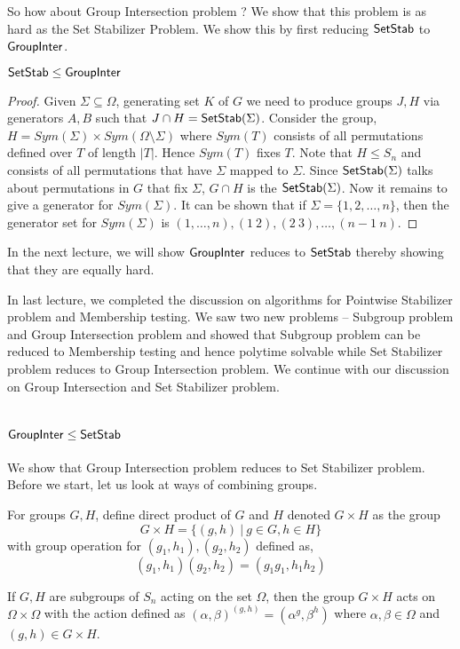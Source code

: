 So how about Group Intersection problem ? We show that this problem is as hard
as the Set Stabilizer Problem. We show this by first reducing ${\sf SetStab}$ to
${\sf GroupInter}$.
\begin{claim}
${\sf SetStab} \le {\sf GroupInter}$
\end{claim}
\begin{proof}
	Given $\Sigma \subseteq \Omega$, generating set $K$ of $G$ we need to
	produce groups $J,H$ via generators $A,B$ such that $J \cap H =
	{\sf SetStab}(\Sigma)$. Consider the group, $H = Sym(\Sigma) \times
	Sym(\Omega \setminus \Sigma)$ where $Sym(T)$  
	consists of all permutations defined over $T$ of length $|T|$. Hence
	$Sym(T)$ fixes $T$. Note that $H \le S_n$ and consists of all
	permutations that have $\Sigma$ mapped to $\Sigma$. Since
	${\sf SetStab}(\Sigma)$ talks about permutations in $G$ that fix $\Sigma$,
	$G \cap H$ is the ${\sf SetStab}(\Sigma)$. Now it remains to give a
	generator for $Sym(\Sigma)$. It can be shown that if $\Sigma
	=\{1,2,\ldots,n\}$, then the generator set for $Sym(\Sigma)$ is
	$(1,\ldots, n), (1~2),(2~3),
	\ldots, (n-1~ n)$.
\end{proof}
In the next lecture, we will show ${\sf GroupInter}$ reduces to ${\sf SetStab}$ thereby
showing that they are equally hard.


In last lecture, we completed the discussion on algorithms for Pointwise
Stabilizer problem and Membership testing. We saw two new problems -- Subgroup
problem and Group Intersection problem and showed that Subgroup problem can be
reduced to Membership testing and hence polytime solvable while Set Stabilizer
problem reduces to Group Intersection problem. We continue with our discussion
on Group Intersection and Set Stabilizer problem.

\section{${\sf GroupInter} \le {\sf SetStab}$}
We show that Group Intersection problem reduces to Set Stabilizer problem. 
Before we start, let us look at ways of combining groups.
\begin{definition}
For groups $G,H$, define direct product of $G$ and $H$ denoted $G \times H$ as
the group 
\[ G \times H = \{(g,h) ~|~ g \in G,h \in H\} \]
with group operation for $(g_1, h_1), (g_2,h_2)$ defined as,
\[ (g_1,h_1)(g_2,h_2) = (g_1g_1,h_1h_2) \]

If $G,H$ are subgroups of $S_n$ acting on the set $\Omega$, then the group $G
\times H$ acts on $\Omega \times \Omega$ with the action defined as
$(\alpha,\beta)^{(g,h)}=(\alpha^g,\beta^h)$
where $\alpha, \beta \in \Omega$ and $(g,h) \in G \times H$.
\end{definition}

